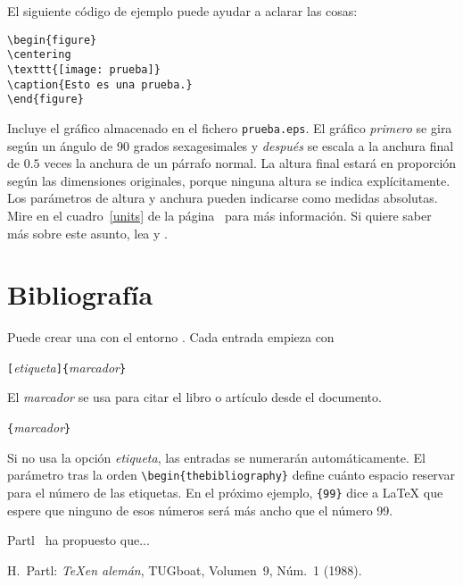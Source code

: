 \pagebreak

El siguiente código de ejemplo puede ayudar a aclarar las cosas:
\begin{code}
\begin{verbatim}
\begin{figure}
\centering
\texttt{[image: prueba]}
\caption{Esto es una prueba.}
\end{figure}
\end{verbatim}
\end{code}
Incluye el gráfico almacenado en el fichero \texttt{prueba.eps}. El
gráfico \emph{primero} se gira según un ángulo de 90 grados
sexagesimales y \emph{después} se escala a la anchura final de $0.5$
veces la anchura de un párrafo normal.  La altura final estará en
proporción según las dimensiones originales,
porque ninguna altura se indica explícitamente.  Los
parámetros de altura y anchura pueden indicarse como medidas
absolutas.  Mire en el cuadro~\ref{units} de la página~\pageref{units}
para más información.  Si quiere saber más sobre este asunto, lea
\cite{graphics} y \cite{eps}.

\section{Bibliografía}
 
Puede crear una  con el entorno
.  Cada entrada empieza con
\begin{lscommand}
\verb|[|\emph{etiqueta}\verb|]{|\emph{marcador}\verb|}|
\end{lscommand}
El \emph{marcador} se usa para citar el libro o artículo desde el documento.
\begin{lscommand}
\verb|{|\emph{marcador}\verb|}|
\end{lscommand}
Si no usa la opción \emph{etiqueta}, las entradas se numerarán
automáticamente.  El parámetro tras la orden
\verb|\begin{thebibliography}| define cuánto espacio reservar para el
número de las etiquetas.  En el próximo ejemplo, \verb|{99}| dice a
\LaTeX{} que espere que ninguno de esos números será más ancho que el
número 99.
\begin{example}
Partl~\cite{pa} ha
propuesto que...
\begin{thebibliography}{99}
 H.~Partl: 
\emph{\TeX en alemán},
TUGboat, Volumen~9, Núm.~1 (1988).
\end{thebibliography}
\end{example}

